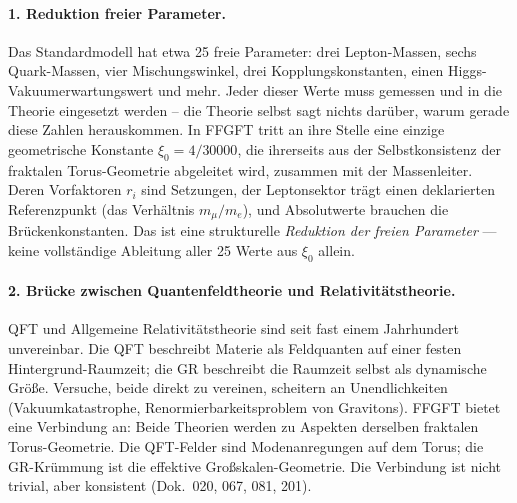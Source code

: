 \paragraph{1. Reduktion freier Parameter.}
Das Standardmodell hat etwa 25 freie Parameter: drei Lepton-Massen,
sechs Quark-Massen, vier Mischungswinkel, drei Kopplungskonstanten,
einen Higgs-Vakuumerwartungswert und mehr. Jeder dieser Werte muss
gemessen und in die Theorie eingesetzt werden -- die Theorie selbst
sagt nichts darüber, warum gerade diese Zahlen herauskommen. In
FFGFT tritt an ihre Stelle eine einzige geometrische Konstante
$\xi_0 = 4/30000$, die ihrerseits aus der Selbstkonsistenz der
fraktalen Torus-Geometrie abgeleitet wird, zusammen mit der
Massenleiter. Deren Vorfaktoren $r_i$ sind Setzungen, der Leptonsektor
trägt einen deklarierten Referenzpunkt (das Verhältnis $m_\mu/m_e$),
und Absolutwerte brauchen die Brückenkonstanten. Das ist eine
strukturelle \emph{Reduktion der freien Parameter} --- keine
vollständige Ableitung aller 25 Werte aus $\xi_0$ allein.

\paragraph{2. Brücke zwischen Quantenfeldtheorie und Relativitätstheorie.}
QFT und Allgemeine Relativitätstheorie sind seit fast einem Jahrhundert
unvereinbar. Die QFT beschreibt Materie als Feldquanten auf einer
festen Hintergrund-Raumzeit; die GR beschreibt die Raumzeit selbst
als dynamische Größe. Versuche, beide direkt zu vereinen, scheitern
an Unendlichkeiten (Vakuumkatastrophe, Renormierbarkeitsproblem von
Gravitons). FFGFT bietet eine Verbindung an: Beide Theorien werden
zu Aspekten derselben fraktalen Torus-Geometrie. Die QFT-Felder sind
Modenanregungen auf dem Torus; die GR-Krümmung ist die effektive
Großskalen-Geometrie. Die Verbindung ist nicht trivial, aber
konsistent (Dok.~020, 067, 081, 201).


